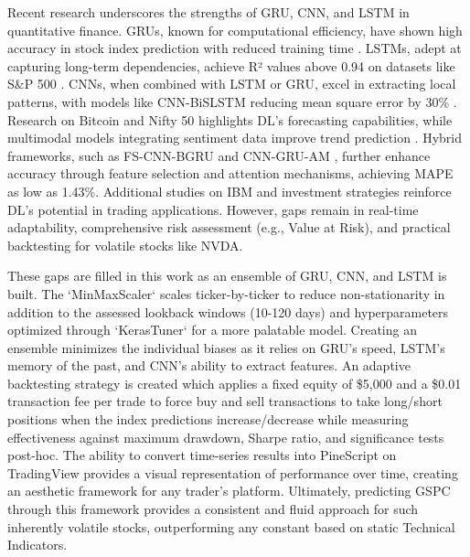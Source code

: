 Recent research underscores the strengths of GRU, CNN, and LSTM in quantitative finance. GRUs, known for computational efficiency, have shown high accuracy in stock index prediction with reduced training time \cite{gru_stock_efficiency_2023}. LSTMs, adept at capturing long-term dependencies, achieve R² values above 0.94 on datasets like S\&P 500 \cite{lstm_sp500_r2_2022}. CNNs, when combined with LSTM or GRU, excel in extracting local patterns, with models like CNN-BiSLSTM reducing mean square error by 30\% \cite{cnn_bislstm_mse_2024}. Research on Bitcoin \cite{bitcoin_forecasting_2024} and Nifty 50 \cite{nifty50_dl_2025} highlights DL’s forecasting capabilities, while multimodal models integrating sentiment data improve trend prediction \cite{multimodal_sentiment_2023}. Hybrid frameworks, such as FS-CNN-BGRU \cite{fs_cnn_bgru_2023} and CNN-GRU-AM \cite{cnn_gru_am_2024}, further enhance accuracy through feature selection and attention mechanisms, achieving MAPE as low as 1.43\%. Additional studies on IBM \cite{ibm_dl_case_2022} and investment strategies \cite{investment_dl_2023} reinforce DL’s potential in trading applications. However, gaps remain in real-time adaptability, comprehensive risk assessment (e.g., Value at Risk), and practical backtesting for volatile stocks like NVDA.

These gaps are filled in this work as an ensemble of GRU, CNN, and LSTM is built. The `MinMaxScaler` scales ticker-by-ticker to reduce non-stationarity in addition to the assessed lookback windows (10-120 days) and hyperparameters optimized through `KerasTuner` for a more palatable model. Creating an ensemble minimizes the individual biases as it relies on GRU's speed, LSTM's memory of the past, and CNN's ability to extract features. An adaptive backtesting strategy is created which applies a fixed equity of \$5,000 and a \$0.01 transaction fee per trade to force buy and sell transactions to take long/short positions when the index predictions increase/decrease while measuring effectiveness against maximum drawdown, Sharpe ratio, and significance tests post-hoc. The ability to convert time-series results into PineScript on TradingView provides a visual representation of performance over time, creating an aesthetic framework for any trader's platform. Ultimately, predicting GSPC through this framework provides a consistent and fluid approach for such inherently volatile stocks, outperforming any constant based on static Technical Indicators.

